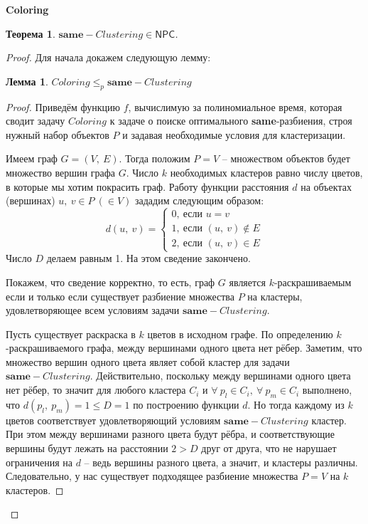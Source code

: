 \documentclass[a4paper,12pt]{article}
\newcommand{\NPCclass}{\mathsf{NPC}}
\newtheorem{theorem}{Теорема}
\newtheorem*{lemma}{Лемма}
\newcommand{\N}{\mathbb{N}}
\begin{document}
\textbf{Coloring}
\begin{algorithmic}
    \Require{Граф $G = (V,\ E)$, число $k \in \N$}
\end{algorithmic}
\begin{theorem}
$\textbf{same}-Clustering \in \NPCclass$.
\end{theorem}
\begin{proof}
    Для начала докажем следующую лемму:
    \begin{lemma}
    $Coloring \leqslant_p \textbf{same}-Clustering$
    \end{lemma}
    \begin{proof}
        Приведём функцию $f$, вычислимую за полиномиальное время, которая сводит задачу $Coloring$ к задаче о поиске оптимального \textbf{same}-разбиения, строя нужный набор объектов $P$ и задавая необходимые условия для кластеризации.
        
        Имеем граф $G = (V,\ E)$. Тогда положим $P = V$ -- множеством объектов будет множество вершин графа $G$. Число $k$ необходимых кластеров равно числу цветов, в которые мы хотим покрасить граф. Работу функции расстояния $d$ на объектах (вершинах) $u,\ v \in P\ (\in V)$ зададим следующим образом:
        \[d(u,\ v) = \begin{cases}0,\ \text{если }u = v\\ 1,\ \text{если }(u,\ v) \notin E\\ 2,\ \text{если } (u,\ v) \in E\end{cases}\]
        Число $D$ делаем равным 1. На этом сведение закончено.
        
        Покажем, что сведение корректно, то есть, граф $G$ является $k$-раскрашиваемым если и только если существует разбиение множества $P$ на кластеры, удовлетворяющее всем условиям задачи $\textbf{same}-Clustering$.
        
        Пусть существует раскраска в $k$ цветов в исходном графе. По определению $k$-раскрашиваемого графа, между вершинами одного цвета нет рёбер. Заметим, что множество вершин одного цвета являет собой кластер для задачи $\textbf{same}-Clustering$. Действительно, поскольку между вершинами одного цвета нет рёбер, то значит  для любого кластера $C_i$ и $\forall\ p_l \in C_i,\ \forall\ p_m \in C_i$ выполнено, что $d(p_l,\ p_m) = 1 \leqslant D = 1$ по построению функции $d$. Но тогда каждому из $k$ цветов соответствует удовлетворяющий условиям $\textbf{same}-Clustering$ кластер. При этом между вершинами разного цвета будут рёбра, и соответствующие вершины будут лежать на расстоянии $2 > D$ друг от друга, что не нарушает ограничения на $d$ -- ведь вершины разного цвета, а значит, и кластеры различны. Следовательно, у нас существует подходящее разбиение множества $P = V$ на $k$ кластеров.
        

\end{proof}
\end{proof}
\end{document}
